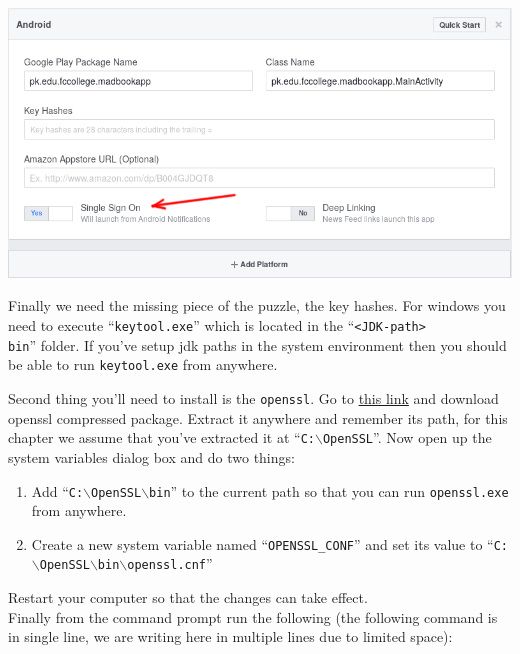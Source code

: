 \begin{center}
	\includegraphics[scale=\SourceCodeScale]{chapters/ch12/images/6}
\end{center}

Finally we need the missing piece of the puzzle, the key hashes. For windows you need to execute ``\texttt{keytool.exe}'' which is located in the ``\texttt{<JDK-path>\\bin}'' folder. If you've setup jdk paths in the system environment then you should be able to run \texttt{keytool.exe} from anywhere. 

Second thing you'll need to install is the \texttt{openssl}. Go to  \href{https://sourceforge.net/projects/openssl/}{this link} and download openssl compressed package. Extract it anywhere and remember its path, for this chapter we assume that you've extracted it at ``\texttt{C:$\backslash$OpenSSL}''. Now open up the system variables dialog box and do two things:

\begin{enumerate}
	\item Add ``\texttt{C:$\backslash$OpenSSL$\backslash$bin}'' to the current path so that you can run \texttt{openssl.exe} from anywhere.
	
	\item Create a new system variable named ``\texttt{OPENSSL\_CONF}'' and set its value to ``\texttt{C:$\backslash$OpenSSL$\backslash$bin$\backslash$openssl.cnf}''
\end{enumerate}

Restart your computer so that the changes can take effect. \\

Finally from the command prompt run the following (the following command is in single line, we are writing here in multiple lines due to limited space): 


